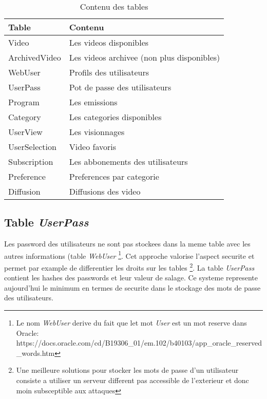 \documentclass[twoside,openright,a4paper,11pt,french]{article}
\begin{document}
\begin{table}[h]
  \centering
  \begin{tabular}{| p{5cm} | l |}
    \hline
    \textbf{Table} & \textbf{Contenu} \\
    \hline
    Video & Les videos disponibles\\
    \hline
    ArchivedVideo  & Les videos archivee (non plus disponibles)\\
    \hline
    WebUser & Profils des utilisateurs \\
    \hline
    UserPass & Pot de passe des utilisateurs \\
    \hline
    Program & Les emissions \\
    \hline
    Category & Les categories disponibles \\
    \hline
    UserView & Les visionnages \\
    \hline
    UserSelection & Video favoris \\
    \hline
    Subscription & Les abbonements des utilisateurs \\
    \hline
    Preference & Preferences par categorie \\
    \hline
    Diffusion & Diffusions des video \\
    \hline
  \end{tabular}
  \caption{Contenu des tables}
  \label{tab:tables}
\end{table}


\subsection{Table {\it UserPass}}

Les password des utilisateurs ne sont pas stockees dans la meme table avec les
autres informations (table {\it WebUser}
\footnote{Le nom {\it WebUser} derive du fait que let mot {\it User} est un mot reserve dans Oracle:
https://docs.oracle.com/cd/B19306\_01/em.102/b40103/app\_oracle\_reserved\_words.htm}.
Cet approche valorise l'aspect securite et permet par
example de differentier les droits sur les tables
\footnote{Une meilleure solutions pour stocker les mots de passe d'un
utilisateur consiste a utiliser un serveur different pas accessible de
l'exterieur et donc  moin subsceptible aux attaques}.
La table {\it UserPass} contient les hashes des passwords et leur valeur de
salage.  Ce systeme represente aujourd'hui le minimum en termes de securite
dans le stockage des mots de passe des utilisateurs.
\end{document}
